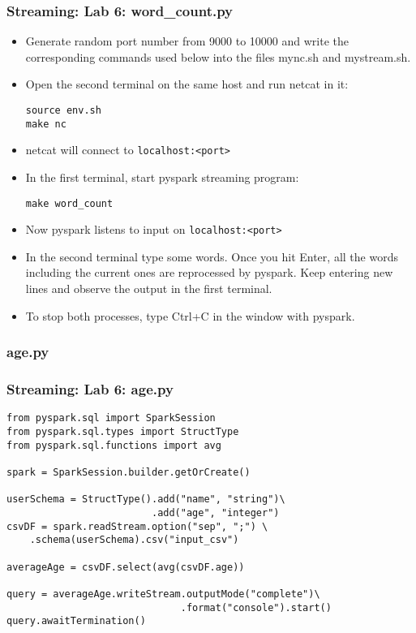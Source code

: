 \begin{frame}[fragile]
\frametitle{Streaming: Lab 6: word\_count.py}
\begin{itemize}
\item Generate random port number from 9000 to 10000 and write the corresponding commands used below into the files 
  {\color{mycolorcli}mync.sh} and {\color{mycolorcli}mystream.sh}.
\item Open the second terminal on the same host and run {\color{mycolorcli}netcat} in it:
{\color{mycolorcli}
\begin{verbatim}
source env.sh
make nc
\end{verbatim}
}
\item netcat will connect to {\color{mycolorcli}\verb|localhost:<port>|}
\item In the first terminal, start pyspark streaming program:
{\color{mycolorcli}
\begin{verbatim}
make word_count
\end{verbatim}
}
\item Now pyspark listens to input on {\color{mycolorcli}\verb|localhost:<port>|}
\item In the second terminal type some words. Once you hit {\color{mycolorcli}Enter}, 
  all the words including the current ones are reprocessed by pyspark. 
  Keep entering new lines and observe the output in the first terminal.
\item To stop both processes, type {\color{mycolorcli}Ctrl+C} in the window with pyspark.
\end{itemize}
\end{frame}

\subsubsection{age.py}
\begin{frame}[fragile]
\frametitle{Streaming: Lab 6: age.py}
{\small
{\color{mycolorcode}
\begin{verbatim}
from pyspark.sql import SparkSession
from pyspark.sql.types import StructType
from pyspark.sql.functions import avg

spark = SparkSession.builder.getOrCreate()

userSchema = StructType().add("name", "string")\
                         .add("age", "integer")
csvDF = spark.readStream.option("sep", ";") \
    .schema(userSchema).csv("input_csv")

averageAge = csvDF.select(avg(csvDF.age))

query = averageAge.writeStream.outputMode("complete")\
                              .format("console").start()
query.awaitTermination()
\end{verbatim}
}
}
\end{frame}


